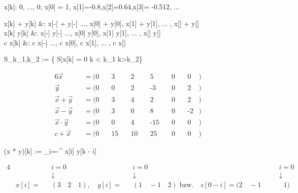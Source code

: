 \begin{abox}
	x[k]: 0, ..., 0, x[0] = 1, x[1]=-0.8,x[2]=0.64,x[3]= -0.512, ...
\end{abox}

\begin{abox}
	x[k] + y[k] &: x[-\infty] + y[-\infty]  ..., x[0] + y[0], x[1] + y[1], ... , x[\infty] + y[\infty]\\
	x[k] \cdot y[k] &: x[-\infty] \cdot y[-\infty]  ..., x[0] \cdot y[0], x[1] \cdot y[1], ... , x[\infty] \cdot y[\infty]\\
	c \cdot x[k] &: c \cdot x[-\infty]  ..., c \cdot x[0], c \cdot x[1], ... , c \cdot x[\infty]\\
\end{abox}

\begin{abox}
	S_{k_1,k_2} := \{ \in S|x[k] = 0 \text{ } \forall k < k_1  k>k_2\}
\end{abox}

\begin{tbox}
	\begin{alignat*}{6}
	\overrightarrow{x} &&= (0 \quad & 3 \quad & 2 \quad & 5 \quad & 0 \quad & 0 &)\\
	\overrightarrow{y} &&= (0 \quad & 0 \quad & 2 \quad & \text{-}3 \quad & 0 \quad & 2 &)\\
	\overrightarrow{x} + \overrightarrow{y} &&= (0 \quad & 3 \quad & 4 \quad & 2 \quad & 0 \quad & 2 &)\\
	\overrightarrow{x} - \overrightarrow{y} &&= ( 0 \quad & 3 \quad & 0 \quad & 8 \quad & 0 \quad & \text{-}2 &)\\
	\overrightarrow{x} \cdot \overrightarrow{y} &&= (0 \quad & 0 \quad & 4 \quad & \text{-}15 \quad & 0 \quad & 0 &)\\
	c + \overrightarrow{x} &&= ( 0 \quad & 15 \quad & 10 \quad & 25 \quad & 0 \quad & 0 &)
	\end{alignat*}
\end{tbox}

\begin{abox}
	(x * y)[k] := \sum_{i=-\infty}^{\infty} x[i] \cdot y[k - i]
\end{abox}

\begin{tbox}
	\begin{alignat*}{4}
	& && i = 0 && i = 0 && i = 0\\
	& && \downarrow && \downarrow && \downarrow\\
	& x[i] = &&(3\quad 2\quad 1), \quad y[i] = &&(1 \quad -1 \quad 2)\text{ bzw.}\quad z[0 - i] = (2 \quad -1 \quad && \text{ } 1)
	\end{alignat*}
\end{tbox}

